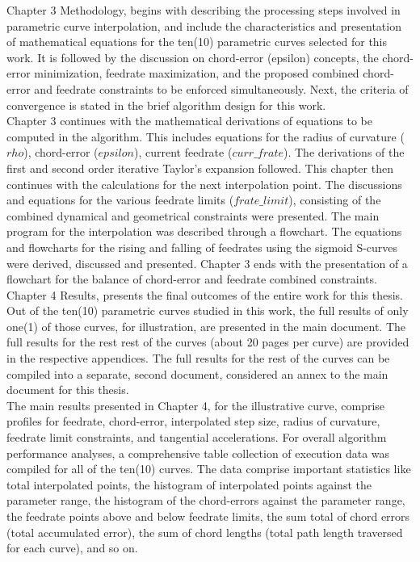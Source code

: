Chapter 3 Methodology, begins with describing the processing steps involved in parametric curve interpolation, and include the characteristics and presentation of mathematical equations for the ten(10) parametric curves selected for this work. It is followed by the discussion on chord-error (epsilon) concepts, the chord-error minimization, feedrate maximization, and the proposed combined chord-error and feedrate constraints to be enforced simultaneously. Next, the criteria of convergence is stated in the brief algorithm design for this work. \\ 

Chapter 3 continues with the mathematical derivations of equations to be computed in the algorithm. This includes equations for the radius of curvature ($rho$), chord-error ($epsilon$), current feedrate ($curr\_frate$). The derivations of the first and second order iterative Taylor's expansion followed. This chapter then continues with the calculations for the next interpolation point. The discussions and equations for the various feedrate limits ($frate\_limit$), consisting of the combined dynamical and geometrical constraints were presented. The main program for the interpolation was described through a flowchart. The equations and flowcharts for the rising and falling of feedrates using the sigmoid S-curves were derived, discussed and presented. Chapter 3 ends with the presentation of a flowchart for the balance of chord-error and feedrate combined constraints. \\

Chapter 4 Results, presents the final outcomes of the entire work for this thesis. Out of the ten(10) parametric curves studied in this work, the full results of only one(1) of those curves, for illustration, are presented in the main document. The full results for the rest rest of the curves (about 20 pages per curve) are provided in the respective appendices. The full results for the rest of the curves can be compiled into a separate, second document, considered an annex to the main document for this thesis.\\

The main results presented in Chapter 4, for the illustrative curve, comprise profiles for feedrate, chord-error, interpolated step size, radius of curvature, feedrate limit constraints, and tangential accelerations. For overall algorithm performance analyses, a comprehensive table collection of execution data was compiled for all of the ten(10) curves. The data comprise important statistics like total interpolated points, the histogram of interpolated points against the parameter range, the histogram of the chord-errors against the parameter range, the feedrate points above and below feedrate limits, the sum total of chord errors (total accumulated error), the sum of chord lengths (total path length traversed for each curve), and so on.\\ 

